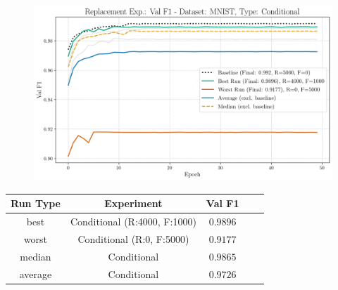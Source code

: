 \begin{figure}[htbp]
	\centering
	\includegraphics[width=.85\textwidth]{abb/strat_classifier_performance/MNIST_STRATIFIED_CLASSIFIERS_COND_GAN/replacement_experiments/val_f1_score_['COND']_MNIST_all.png}
	\label{fig:app_strat_class_performance_replacement_exp._val_f1_score_cGAN}
\end{figure}
\begin{table}[H]
	\centering
	\vspace{-1em}
	\begin{tabular}{|c|c|c|c|c|}
		\hline
		Run Type & Experiment & Val F1 \\ \hline
		best & Conditional (R:4000, F:1000) & $0.9896$\\ \hline
		worst & Conditional (R:0, F:5000) & $0.9177$\\ \hline
		median & Conditional & $0.9865$\\ \hline
		average & Conditional & $0.9726$
		\\ \hline
	\end{tabular}
\end{table}
\newpage
